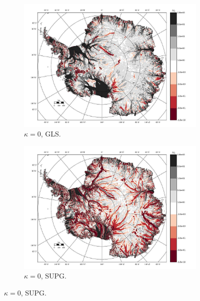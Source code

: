 \begin{figure}
  \label{antarctica_bv_image_U_ob_S_misfit}

\end{figure}


\begin{figure}

  \centering

  \begin{subfigure}[b]{0.45\linewidth}
    \includegraphics[width=\linewidth]{images/balance_velocity/antarctica/d_U_ob/misfit_10H_kappa_0_GLS.jpg}
  \caption{$\kappa = 0$, GLS.}
  \label{antarctica_bv_image_kappa_0_GLS_U_ob_misfit}
  \end{subfigure}
  \begin{subfigure}[b]{0.45\linewidth}
    \includegraphics[width=\linewidth]{images/balance_velocity/antarctica/d_U_ob/misfit_10H_kappa_0_SUPG.jpg}
  \caption{$\kappa = 0$, SUPG.}
  \label{antarctica_bv_image_kappa_0_SUPG_U_ob_misfit}
  \end{subfigure}


\end{figure}
